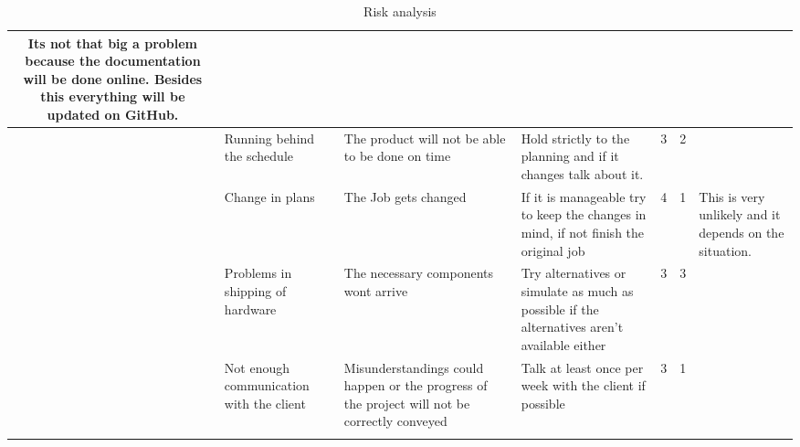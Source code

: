 \begin{longtable}{| c | p{3cm} | p{3cm} | p{4cm} | c | c | p{3cm} |}
    \cellcolor{lightgray}Its not that big a problem because the documentation will be done online. Besides this everything will be updated on GitHub.
    \\ \hline
    \rowcolor{cyan}\theriskTableCounter{} &
    \stepcounter{riskTableCounter}
    Running behind the schedule&
    The product will not be able to be done on time&
    Hold strictly to the planning and if it changes talk about it.&
    \cellcolor{yellow}3&
    \cellcolor{lime}2&
    \cellcolor{lightgray}
    \\ \hline
    \rowcolor{teal}\theriskTableCounter{} &
    \stepcounter{riskTableCounter}
    Change in plans&
    The Job gets changed&
    If it is manageable try to keep the changes in mind, if not finish the original job&
    \cellcolor{orange}4&
    \cellcolor{green}1&
    \cellcolor{lightgray}This is very unlikely and it depends on the situation. 
    \\ \hline
    \rowcolor{cyan}\theriskTableCounter{} &
    \stepcounter{riskTableCounter}
    Problems in shipping of hardware&
    The necessary components wont arrive&
    Try alternatives or simulate as much as possible if the alternatives aren't available either&
    \cellcolor{yellow}3&
    \cellcolor{yellow}3&
    \cellcolor{lightgray}
    \\ \hline
    \rowcolor{teal}\theriskTableCounter{} &
    \stepcounter{riskTableCounter}
    Not enough communication with the client&
    Misunderstandings could happen or the progress of the project will not be correctly conveyed&
    Talk at least once per week with the client if possible&
    \cellcolor{yellow}3&
    \cellcolor{lime}1&\cellcolor{lightgray}
    \\ \hline
    \caption{Risk analysis}
    \label{tab:risico_analyse}
\end{longtable}


\newpage
